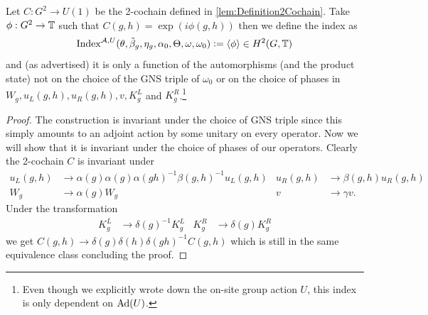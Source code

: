\documentclass[11pt,a4paper,twoside]{article}
\numberwithin{equation}{section}
\begin{document}
	\begin{definition}\label{def:DefinitionOfTheH2ValuedIndex}
		Let $C:G^2\rightarrow U(1)$ be the 2-cochain defined in \ref{lem:Definition2Cochain}. Take $\phi:G^2\rightarrow\mathbb T$ such that $C(g,h)=\exp(i\phi(g,h))$ then we define the index as
		\begin{equation}
			\textrm{Index}^{\mathcal A,U}(\theta,\tilde{\beta}_g,\eta_g,\alpha_0,\Theta,\omega,\omega_0)\vcentcolon=\expval{\phi}\in H^2(G,\mathbb T)
		\end{equation}
		and (as advertised) it is only a function of the automorphisms (and the product state) not on the choice of the GNS triple of $\omega_0$ or on the choice of phases in $W_g,u_L(g,h),u_R(g,h),v,K_g^L$ and $K_g^R$.\footnote{Even though we explicitly wrote down the on-site group action $U$, this index is only dependent on $\Ad{U}$.}
	\end{definition}
	\begin{proof}
		The construction is invariant under the choice of GNS triple since this simply amounts to an adjoint action by some unitary on every operator. Now we will show that it is invariant under the choice of phases of our operators. Clearly the 2-cochain $C$ is invariant under
		\begin{align}
			u_L(g,h)&\rightarrow \alpha(g)\alpha(g)\alpha(gh)^{-1}\beta(g,h)^{-1} u_L(g,h)&u_R(g,h)&\rightarrow \beta(g,h)u_R(g,h)\\
			\nonumber
			W_g&\rightarrow\alpha(g)W_g&v&\rightarrow \gamma v.
		\end{align}
		Under the transformation
		\begin{align}
			K_g^L&\rightarrow \delta(g)^{-1}K_g^L&K_g^R&\rightarrow \delta(g)K_g^R
		\end{align}
		we get $C(g,h)\rightarrow \delta(g)\delta(h)\delta(gh)^{-1}C(g,h)$ which is still in the same equivalence class concluding the proof.
	\end{proof}
\end{document}
